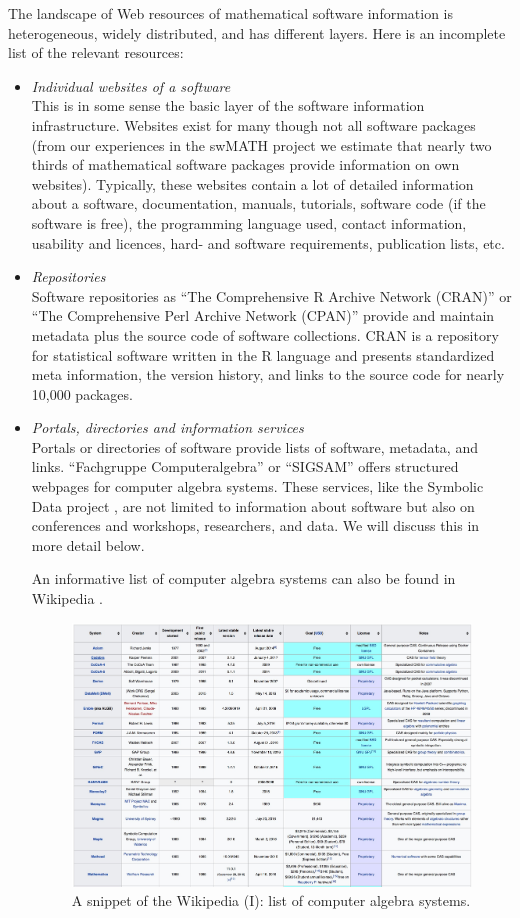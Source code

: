 \documentclass[12pt]{article}
\begin{document}
The landscape of Web resources of mathematical software information is heterogeneous, widely distributed, and has different layers.  Here is an incomplete list of the relevant resources:
\begin{itemize}
\item{\textit{Individual websites of a software}}\\
This is in some sense the basic layer of the software information
infrastructure. Websites exist for many though not all software packages (from our experiences in the swMATH project we estimate that  nearly two thirds of mathematical software packages provide information on own websites). Typically, these websites contain a lot of detailed information about a software, documentation, manuals, tutorials, software code (if the software is free), the programming language used, contact information, usability and licences, hard- and software requirements, publication lists, etc.
\item{\textit{Repositories}}\\
Software repositories as ``The Comprehensive R Archive Network (CRAN)'' \cite{CRAN} or ``The Comprehensive Perl Archive Network (CPAN)'' \cite{CPAN} provide and maintain  metadata plus the source code of software collections. CRAN is a repository for statistical software written in the R language and presents standardized meta information, the version history,  and links to the source code for nearly 10,000 packages.
\item{\textit{Portals, directories and information services}}\\
Portals or directories of software provide lists of software, metadata, and links. ``Fachgruppe Computeralgebra'' \cite{FAG} or ``SIGSAM'' \cite{SIGSAM} offers structured webpages for computer
algebra systems. These services, like the Symbolic Data project \cite{SD}, are not limited to information about software but also on conferences and workshops, researchers, and data. We will discuss this in more detail below.

An informative list of computer algebra systems can also be found in  Wikipedia \cite{WikipediaCAS}.

\begin{figure}[h]
  \centering
  \includegraphics[scale=0.22]{aca3}
  \caption{A snippet of the Wikipedia (I): list of  computer algebra systems.\label{abb_3}}
\end{figure}


\end{itemize}
\end{document}
